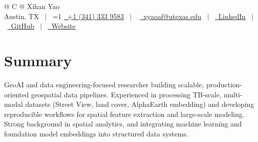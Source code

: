 \documentclass[a4paper,12pt]{article}
\providecommand{\PrivateBuild}{0}
\begin{document}
\pagestyle{empty}

\begin{tabularx}{\linewidth}{@{} C @{}}
{\Huge Xihan Yao \quad {\Large }} \\[6pt]

Austin, TX \ $|$ \
\ifnum\PrivateBuild=1
\href{tel:+13413339583}{\raisebox{-0.05\height}\faMobile\ +1 (341) 333 9583} \ $|$ \
\fi
\href{mailto:xyaoaf@utexas.edu}{\raisebox{-0.05\height}\faEnvelope\ xyaoaf@utexas.edu} \ $|$ \
\href{https://www.linkedin.com/in/xihan-yao-6381b3181/}{\raisebox{-0.05\height}\faLinkedin\ LinkedIn} \ $|$ \
\href{https://github.com/xyaoaf}{\raisebox{-0.05\height}\faGithub\ GitHub} \ $|$ \
\href{https://xyaoaf.github.io/}{\raisebox{-0.05\height}\faGlobe\ Website}

\end{tabularx}



\section{Summary}
GeoAI and data engineering-focused researcher building scalable, production-oriented geospatial data pipelines. Experienced in processing TB-scale, multi-modal datasets (Street View, land cover, AlphaEarth embedding) and developing reproducible workflows for spatial feature extraction and large-scale modeling. Strong background in spatial analytics, and integrating machine learning and foundation model embeddings into structured data systems.


\end{document}
